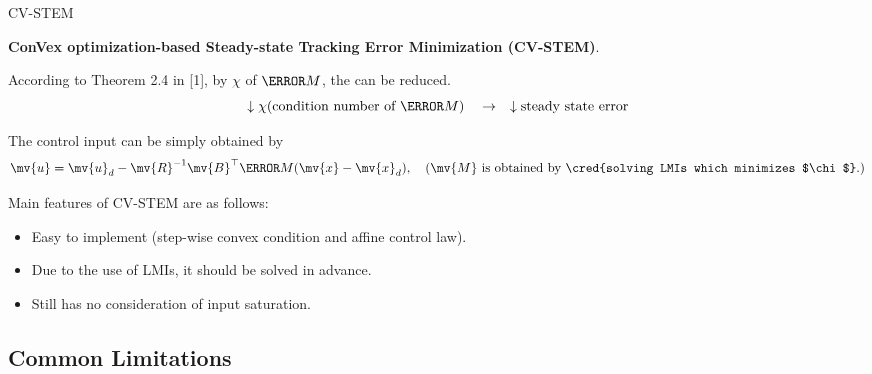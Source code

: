 \begin{frame}{\insertsubsectionhead}{CV-STEM}

  \textbf{ConVex optimization-based Steady-state Tracking Error Minimization (CV-STEM)}.

  \hfill


  According to Theorem 2.4 in [1], by  $\chi$ of $\mm{M}$, the  can be reduced.
  \begin{equation}
    \downarrow \chi \text{(condition number of $\mm{M}$)} \quad \rightarrow \quad \downarrow \text{steady state error}
  \end{equation}

  The control input can be simply obtained by
  \begin{equation}
      \mv{u} = \mv{u}_d - \mv{R}^{-1}\mv{B}^\top \mm{M}(\mv{x}-\mv{x}_d)
        ,\quad
        (
          \mv{M} \text{ is obtained by \cred{solving LMIs which minimizes $\chi$}.}
        )
  \end{equation}

  Main features of CV-STEM are as follows:
  \begin{itemize}
      \item Easy to implement (step-wise convex condition and affine control law).
      \item Due to the use of LMIs, it should be solved in advance.
      \item Still has no consideration of input saturation.
  \end{itemize}
\end{frame}

\subsection{Common Limitations}

